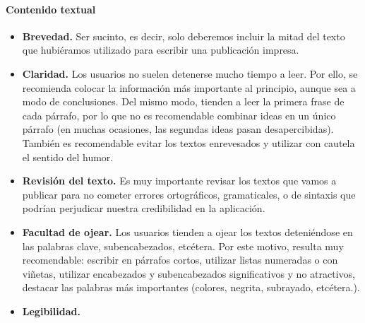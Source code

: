 \documentclass[a4paper,oneside,11pt]{book}
\begin{document}
		\paragraph{Contenido textual} %
		\label{par:cont_contenido_textual}
			\begin{itemize}
				\item \textbf{Brevedad.} Ser sucinto, es decir, solo deberemos incluir la mitad del texto que hubiéramos utilizado para escribir una publicación impresa.
				\item \textbf{Claridad.} Los usuarios no suelen detenerse mucho tiempo a leer. Por ello, se recomienda colocar la información más importante al principio, aunque sea a modo de conclusiones. Del mismo modo, tienden a leer la primera frase de cada párrafo, por lo que no es recomendable combinar ideas en un único párrafo (en muchas ocasiones, las segundas ideas pasan desapercibidas). También es recomendable evitar los textos enrevesados y utilizar con cautela el sentido del humor.
				\item \textbf{Revisión del texto.} Es muy importante revisar los textos que vamos a publicar para no cometer errores ortográficos, gramaticales, o de sintaxis que podrían perjudicar nuestra credibilidad en la aplicación.
				\item \textbf{Facultad de ojear.} Los usuarios tienden a ojear los textos deteniéndose en las palabras clave, subencabezados, etcétera. Por este motivo, resulta muy recomendable: escribir en párrafos cortos, utilizar listas numeradas o con viñetas, utilizar encabezados y subencabezados significativos y no atractivos, destacar las palabras más importantes (colores, negrita, subrayado, etcétera.).
				\item \textbf{Legibilidad.} 
			\end{itemize}
		
	
\end{document}
